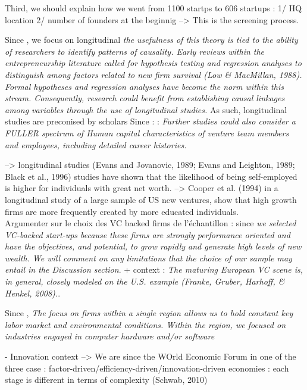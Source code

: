 \begin{itemize}
\begin{itemize}
Third, we should explain how we went from 1100 startps to 606 startups : 1/ HQ location 2/ number of founders at the beginnig --> This is the screening process.

Since \citep{marvel2016human}, we focus on longitudinal \textit{the usefulness of this theory is tied to the ability of researchers to identify patterns of causality. Early reviews within the entrepreneurship literature called for hypothesis testing and regression analyses to distinguish among factors related to new firm survival (Low & MacMillan, 1988). Formal hypotheses and regression analyses have become the norm within this stream. Consequently, research could benefit from establishing causal linkages among variables through the use of longitudinal studies.} As such, longitudinal studies are preconised by scholars Since : \citep{steffens2012birds}: \textit{Further studies could also consider a \textit{FULLER} spectrum of Human capital characteristics of venture team members and employees, including detailed career histories.}

--> longitudinal studies (Evans and Jovanovic, 1989; Evans and Leighton, 1989; Black et al., 1996) studies have shown that the likelihood of being self-employed is higher for individuals with great net worth.
--> Cooper et al. (1994) in a longitudinal study of a large sample of US new ventures, show that high growth firms are more frequently created by more educated individuals.
\\

Argumenter sur le choix des VC backed firms de l'échantillon : since \citep{gruber2012minds} \textit{we selected VC-backed start-ups because these firms are strongly performance oriented and have the objectives, and potential, to grow rapidly and generate high levels of new wealth. We will comment on any limitations that the choice of our sample may entail in the Discussion section}. + context : \textit{The maturing European VC scene is, in general, closely modeled on the U.S. example (Franke, Gruber, Harhoff, & Henkel, 2008).}.

Since \citet{beckman2007early}, \textit{The focus on firms within a single region allows us to hold constant key labor market and environmental conditions. Within the region, we focused on industries engaged in computer hardware and/or software}

- Innovation context --> We are since the WOrld Economic Forum in one of the three case : factor-driven/efficiency-driven/innovation-driven economies : each stage is different in terms of complexity (Schwab, 2010)


\end{itemize}
\end{itemize}
